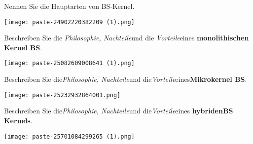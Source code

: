 \documentclass{article}
\begin{document}
\begin{tcolorbox}[colback=white!10!white,colframe=lightgray!75!black,
  savelowerto=\jobname_ex.tex,breakable,enhanced,lines before break=40]

\justifying
Nennen Sie die Hauptarten von BS-Kernel.

\tcblower

\justifying
\begin{center}
\texttt{[image: paste-24902220382209 (1).png]}
\end{center}

\end{tcolorbox}
\begin{tcolorbox}[colback=white!10!white,colframe=lightgray!75!black,
  savelowerto=\jobname_ex.tex,breakable,enhanced,lines before break=40]

\justifying
Beschreiben Sie die \textit{Philosophie, Nachteile}und die \textit{Vorteile}eines \textbf{monolithischen Kernel BS}.

\tcblower

\justifying
\begin{center}
\texttt{[image: paste-25082609008641 (1).png]}
\end{center}

\end{tcolorbox}
\begin{tcolorbox}[colback=white!10!white,colframe=lightgray!75!black,
  savelowerto=\jobname_ex.tex,breakable,enhanced,lines before break=40]

\justifying
Beschreiben Sie die\textit{Philosophie, Nachteile}und die\textit{Vorteile}eines\textbf{Mikrokernel BS}.

\tcblower

\justifying
\begin{center}
\texttt{[image: paste-25232932864001.png]}
\end{center}

\end{tcolorbox}
\begin{tcolorbox}[colback=white!10!white,colframe=lightgray!75!black,
  savelowerto=\jobname_ex.tex,breakable,enhanced,lines before break=40]

\justifying
Beschreiben Sie die\textit{Philosophie, Nachteile}und die\textit{Vorteile}eines \textbf{hybridenBS Kernels}.

\tcblower

\justifying
\begin{center}
\texttt{[image: paste-25701084299265 (1).png]}
\end{center}

\end{tcolorbox}
\end{document}
